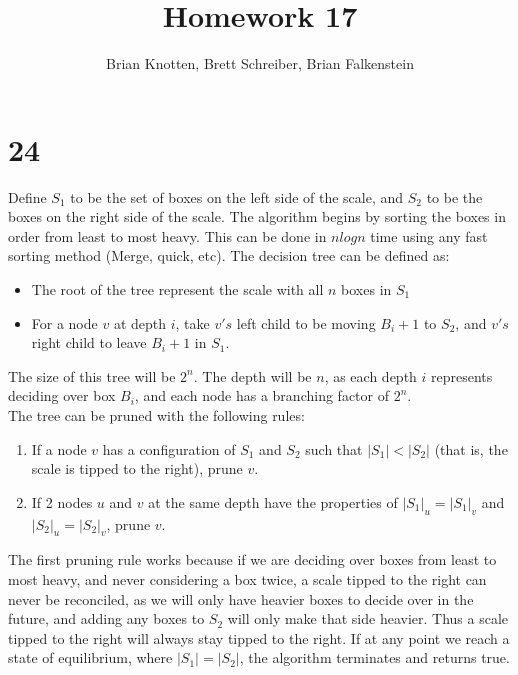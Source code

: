 \documentclass[letterpaper,notitlepage,twoside]{article}
\begin{document}
\title{Homework 17}
\author{Brian Knotten, Brett Schreiber, Brian Falkenstein}
\maketitle

\section*{24}
Define $S_1$ to be the set of boxes on the left side of the scale, and $S_2$ to be the boxes on the right side of the scale. The algorithm begins by sorting the boxes in order from least to most heavy. This can be done in $nlogn$ time using any fast sorting method (Merge, quick, etc). 
The decision tree can be defined as:
\begin{itemize}
\item The root of the tree represent the scale with all $n$ boxes in $S_1$
\item For a node $v$ at depth $i$, take $v's$ left child to be moving $B_i+1$ to $S_2$, and $v's$ right child to leave $B_i+1$ in $S_1$. 
\end{itemize}
The size of this tree will be $2^n$. The depth will be $n$, as each depth $i$ represents deciding over box $B_i$, and each node has a branching factor of $2^n$. \\
The tree can be pruned with the following rules:
\begin{enumerate}
\item If a node $v$ has a configuration of $S_1$ and $S_2$ such that $|S_1|<|S_2|$ (that is, the scale is tipped to the right), prune $v$. 
\item If 2 nodes $u$ and $v$ at the same depth have the properties of $|S_1|_u = |S_1|_v$ and $|S_2|_u = |S_2|_v$, prune $v$.  
\end{enumerate}
The first pruning rule works because if we are deciding over boxes from least to most heavy, and never considering a box twice, a scale tipped to the right can never be reconciled, as we will only have heavier boxes to decide over in the future, and adding any boxes to $S_2$ will only make that side heavier. Thus a scale tipped to the right will always stay tipped to the right. If at any point we reach a state of equilibrium, where $|S_1| = |S_2|$, the algorithm terminates and returns true.
\end{document}
